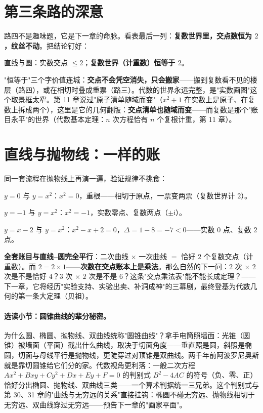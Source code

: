 \section{第三条路的深意}

路四不是趣味题，它是下一章的命脉。看表最后一列：\textbf{复数世界里，交点数恒为 $2$，纹丝不动}。把结论钉好：

\begin{jielun}
直线与圆：实数交点 $\le 2$；\textbf{复数世界（计重数）恒等于 $2$}。
\end{jielun}

"恒等于"三个字价值连城：\textbf{交点不会凭空消失，只会搬家}——搬到复数看不见的楼层（路四），或在相切时叠成重票（路三）。代数的世界永远完整，是"实数画图"这个取景框太窄。第 11 章说过"原子清单随域而变"（$x^2+1$ 在实数上是原子、在复数上拆成两个），这里是它的几何翻版：\textbf{交点清单也随域而变}——而复数是那个"账目永平"的世界（代数基本定理：$n$ 次方程恰有 $n$ 个复根计重，第 11 章）。

\section{直线与抛物线：一样的账}

同一套流程在抛物线上再演一遍，验证规律不挑食：

$y = 0$ 与 $y = x^2$：$x^2 = 0$，重根——相切于原点，一票变两票（复数世界计 $2$）。

$y = -1$ 与 $y = x^2$：$x^2 = -1$，实数零点、复数两点（$\pm\mathrm{i}$）。

$y = x - 2$ 与 $y = x^2$：$x^2 - x + 2 = 0$，$\Delta = 1 - 8 = -7 < 0$——实数 $0$ 点、复数 $2$ 点。

\textbf{全套账目与直线--圆完全平行}：二次曲线 $\times$ 一次曲线 $=$ 恰好 $2$ 个复数交点（计重数）。而 $2 = 2\times1$——\textbf{次数在交点账本上是乘法}。那么自然的下一问：$2$ 次 $\times$ $2$ 次是不是恰好 $4$？$3$ 次 $\times$ $2$ 次是不是 $6$？这条"交点乘法表"能不能长成定理？——下一章，它将经历"实验支持、实验出卖、补洞成神"的三幕剧，最终登基为代数几何的第一条大定理（贝祖）。

\paragraph{选读小节：圆锥曲线的辈分秘密。}为什么圆、椭圆、抛物线、双曲线统称"圆锥曲线"？拿手电筒照墙面：光锥（圆锥）被墙面（平面）截出什么曲线，取决于切面角度——垂直照是圆，斜照是椭圆，切面与母线平行是抛物线，更陡穿过对顶锥是双曲线。两千年前阿波罗尼奥斯就是靠切圆锥给它们分的家。代数视角更利落：一般二次方程 $Ax^2 + Bxy + Cy^2 + Dx + Ey + F = 0$ 的判别式 $B^2 - 4AC$ 的符号（负、零、正）恰好分出椭圆、抛物线、双曲线三类——一个算术判据统一三兄弟。这个判别式与第 30、31 章的"曲线与无穷远的关系"直接挂钩：椭圆不碰无穷远、抛物线相切于无穷远、双曲线穿过无穷远——预告下一章的"画家平面"。


